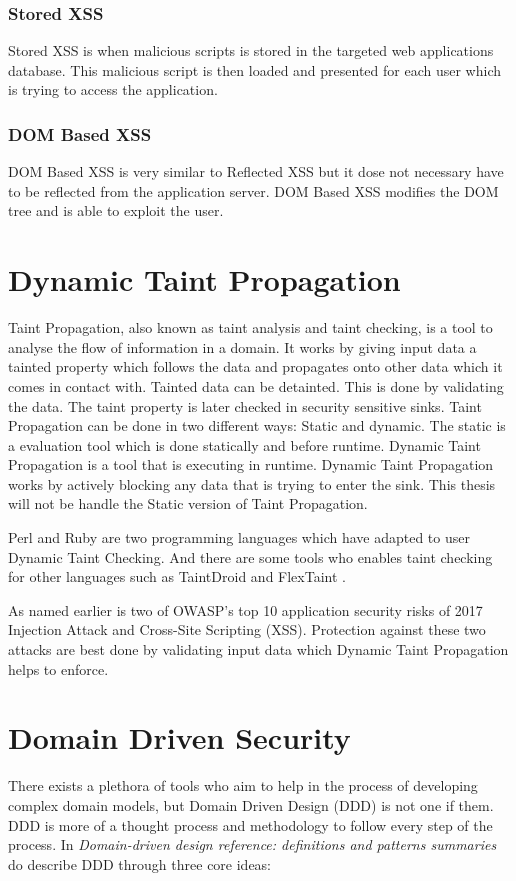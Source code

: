 \subsubsection{Stored XSS}
Stored XSS is when malicious scripts is stored in the targeted web applications database. This malicious script is then loaded and presented for each user which is trying to access the application. \parencite{Secure_Web}


\subsubsection{DOM Based XSS}
DOM Based XSS is very similar to Reflected XSS but it dose not necessary have to be reflected from the application server. DOM Based XSS modifies the DOM tree and is able to exploit the user. \parencite{Secure_Web}


\section{Dynamic Taint Propagation}
Taint Propagation, also known as taint analysis and taint checking, is a tool to analyse the flow of information in a domain. \parencite{Pan2015} It works by giving input data a tainted property which follows the data and propagates onto other data which it comes in contact with. Tainted data can be detainted. This is done by validating the data. The taint property is later checked in security sensitive sinks. \parencite{Pan2015} Taint Propagation can be done in two different ways: Static and dynamic. The static is a evaluation tool which is done statically and before runtime. Dynamic Taint Propagation is a tool that is executing in runtime. Dynamic Taint Propagation works by actively blocking any data that is trying to enter the sink. This thesis will not be handle the Static version of Taint Propagation. 

Perl and Ruby are two programming languages which have adapted to user Dynamic Taint Checking. \parencite{perl, ruby} And there are some tools who enables taint checking for other languages such as TaintDroid \parencite{Ma2010} and FlexTaint \parencite{Venkataramani2008}.

As named earlier is two of OWASP's top 10 application security risks of 2017 Injection Attack and Cross-Site Scripting (XSS). \parencite{OWASP2017} Protection against these two attacks are best done by validating input data which Dynamic Taint Propagation helps to enforce.


\section{Domain Driven Security}
There exists a plethora of tools who aim to help in the process of developing complex domain models, but Domain Driven Design (DDD) is not one if them. \parencite{Bankes, 10.1007/978-3-319-24309-2_33} DDD is more of a thought process and methodology to follow every step of the process. \parencite{EvansEric2004Dd:t} In \emph{Domain-driven design reference: definitions and patterns summaries} do \textcite{evans_2015} describe DDD through three core ideas:

